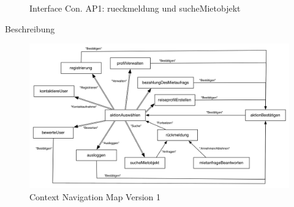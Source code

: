 \begin{figure}[H]
\centering
\hfill
{}
\hfill %
\hfill %
\caption{Interface Con. AP1: rueckmeldung und sucheMietobjekt }
\label{interfaceContents6}
\end{figure}

Beschreibung

\begin{figure}[H]
\includegraphics[width=1\textwidth]{./images/navigationmap1.png}
\caption{Context Navigation Map Version 1}
\label{fig:navigationmap1}
\end{figure}


